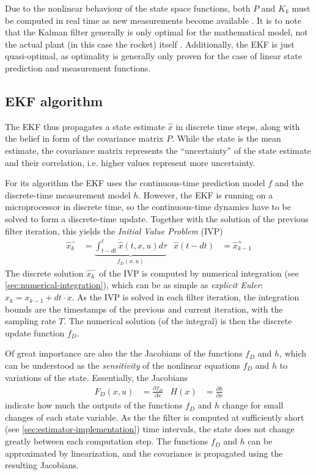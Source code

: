 Due to the nonlinear behaviour of the state space functions, both $P$ and $K_k$ must be computed in real time as new measurements become available \cite{lewis2008}.
It is to note that the Kalman filter generally is only optimal for the mathematical model, not the actual plant (in this case the rocket) itself \cite{lewis2008}.
Additionally, the EKF is just quasi-optimal, as optimality is generally only proven for the case of linear state prediction and measurement functions.

\subsection{EKF algorithm}
The EKF thus propagates a state estimate $\hat x$ in discrete time steps, along with the belief in form of the covariance matrix $P$.
While the state is the mean estimate, the covariance matrix represents the ``uncertainty'' of the state estimate and their correlation, i.e. higher values represent more uncertainty. 

For its algorithm the EKF uses the continuous-time prediction model $f$ and the discrete-time measurement model $h$.
However, the EKF is running on a microprocessor in discrete time, so the continuous-time dynamics have to be solved to form a discrete-time update. 
Together with the solution of the previous filter iteration, this yields the \textit{Initial Value Problem} (IVP) 
\begin{align}
     \hat x_k^- &= \underbrace{\int_{t-dt}^{t} \dot{\hat x}(t,x,u) d\tau}_{f_D(x,u)}
     &
     \hat x (t-dt) &= \hat x_{k-1}^+
     \label{eq:estimator-ivp}
\end{align}
The discrete solution $\hat x_k^-$ of the IVP is computed by numerical integration (see \autoref{sec:numerical-integration}), which can be as simple as \textit{explicit Euler}: $x_k = x_{k-1} + dt \cdot \dot x$.
As the IVP is solved in each filter iteration, the integration bounds are the timestamps of the previous and current iteration, with the sampling rate $T$.
The numerical solution (of the integral) is then the discrete update function $f_D$.

Of great importance are also the the Jacobians of the functions $f_D$ and $h$, which can be understood as the \textit{sensitivity} of the nonlinear equations $f_D$ and $h$ to variations of the state.
Essentially, the Jacobians 
\begin{align}
    F_D(x, u) &= \frac{\partial f_D}{\partial x}
    &
    H(x) &= \frac{\partial h}{\partial x}
\end{align}
indicate how much the outputs of the functions $f_D$ and $h$ change for small changes of each state variable. 
As the the filter is computed at sufficiently short (see \autoref{sec:estimator-implementation}) time intervals, the state does not change greatly between each computation step.
The functions $f_D$ and $h$ can be approximated by linearization, and the covariance is propagated using the resulting Jacobians.

